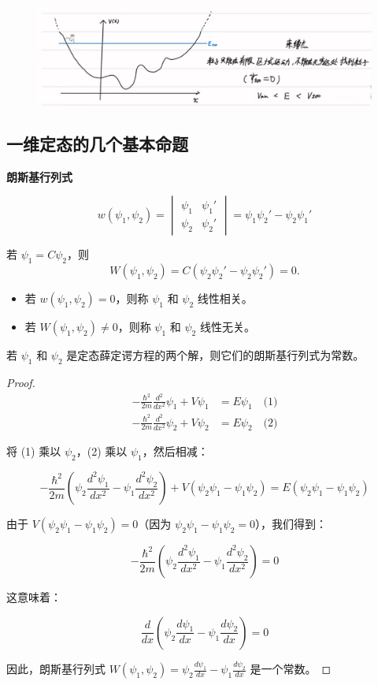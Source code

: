 \documentclass[lang=cn,10pt]{elegantbook}
\begin{document}
\begin{figure}[H]
	\centering
	\includegraphics[width=0.7\linewidth]{figure/screenshot0023}
\end{figure}

\subsection{一维定态的几个基本命题}
\textbf{朗斯基行列式}

\[
w(\psi_1, \psi_2) = 
\begin{vmatrix}
	\psi_1 & \psi_1' \\
	\psi_2 & \psi_2'
\end{vmatrix}
= \psi_1 \psi_2' - \psi_2 \psi_1'
\]

若 \(\psi_1 = C \psi_2\)，则
\[
W(\psi_1, \psi_2) = C (\psi_2 \psi_2' - \psi_2 \psi_2') = 0.
\]

\begin{itemize}
	\item 若 \(w(\psi_1, \psi_2) = 0\)，则称 \(\psi_1\) 和 \(\psi_2\) 线性相关。
	\item 若 \(W(\psi_1, \psi_2) \neq 0\)，则称 \(\psi_1\) 和 \(\psi_2\) 线性无关。
\end{itemize}

\begin{proposition}
	若 $\psi_1$ 和 $\psi_2$ 是定态薛定谔方程的两个解，则它们的朗斯基行列式为常数。
\end{proposition}


\begin{proof}
	\begin{align*}
		-\frac{\hbar^2}{2m} \frac{d^2}{dx^2} \psi_1 + V \psi_1 &= E \psi_1 \quad \text{(1)} \\
		-\frac{\hbar^2}{2m} \frac{d^2}{dx^2} \psi_2 + V \psi_2 &= E \psi_2 \quad \text{(2)}
	\end{align*}
	
	将 (1) 乘以 $\psi_2$，(2) 乘以 $\psi_1$，然后相减：
	
	\[
	-\frac{\hbar^2}{2m} \left( \psi_2 \frac{d^2 \psi_1}{dx^2} - \psi_1 \frac{d^2 \psi_2}{dx^2} \right) + V(\psi_2 \psi_1 - \psi_1 \psi_2) = E(\psi_2 \psi_1 - \psi_1 \psi_2)
	\]
	
	由于 $V(\psi_2 \psi_1 - \psi_1 \psi_2) = 0$（因为 $\psi_2 \psi_1 - \psi_1 \psi_2 = 0$），我们得到：
	
	\[
	-\frac{\hbar^2}{2m} \left( \psi_2 \frac{d^2 \psi_1}{dx^2} - \psi_1 \frac{d^2 \psi_2}{dx^2} \right) = 0
	\]
	
	这意味着：
	
	\[
	\frac{d}{dx} \left( \psi_2 \frac{d \psi_1}{dx} - \psi_1 \frac{d \psi_2}{dx} \right) = 0
	\]
	
	因此，朗斯基行列式 $W(\psi_1, \psi_2) = \psi_2 \frac{d \psi_1}{dx} - \psi_1 \frac{d \psi_2}{dx}$ 是一个常数。
\end{proof}
\end{document}
